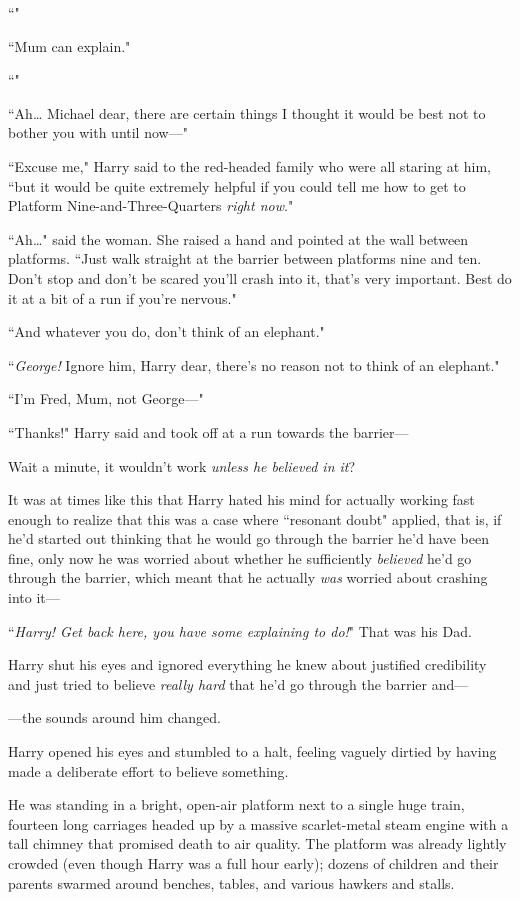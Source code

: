 ``"

``Mum can explain."

``"

``Ah{\ldots} Michael dear, there are certain things I thought it would be best not to bother you with until now—"

``Excuse me," Harry said to the red-headed family who were all staring at him, ``but it would be quite extremely helpful if you could tell me how to get to Platform Nine-and-Three-Quarters \emph{right now}."

``Ah{\ldots}" said the woman. She raised a hand and pointed at the wall between platforms. ``Just walk straight at the barrier between platforms nine and ten. Don't stop and don't be scared you'll crash into it, that's very important. Best do it at a bit of a run if you're nervous."

``And whatever you do, don't think of an elephant."

``\emph{George!} Ignore him, Harry dear, there's no reason not to think of an elephant."

``I'm Fred, Mum, not George—"

``Thanks!" Harry said and took off at a run towards the barrier—

Wait a minute, it wouldn't work \emph{unless he believed in it}?

It was at times like this that Harry hated his mind for actually working fast enough to realize that this was a case where ``resonant doubt" applied, that is, if he'd started out thinking that he would go through the barrier he'd have been fine, only now he was worried about whether he sufficiently \emph{believed} he'd go through the barrier, which meant that he actually \emph{was} worried about crashing into it—

``\emph{Harry! Get back here, you have some explaining to do!}" That was his Dad.

Harry shut his eyes and ignored everything he knew about justified credibility and just tried to believe \emph{really hard} that he'd go through the barrier and—

—the sounds around him changed.

Harry opened his eyes and stumbled to a halt, feeling vaguely dirtied by having made a deliberate effort to believe something.

He was standing in a bright, open-air platform next to a single huge train, fourteen long carriages headed up by a massive scarlet-metal steam engine with a tall chimney that promised death to air quality. The platform was already lightly crowded (even though Harry was a full hour early); dozens of children and their parents swarmed around benches, tables, and various hawkers and stalls.

